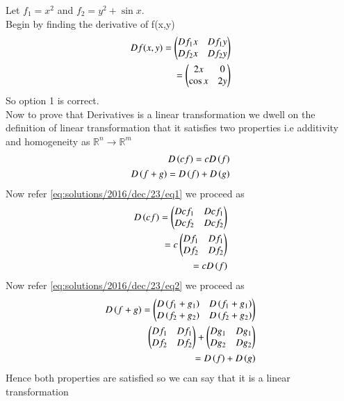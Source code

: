 Let $f_1= x^2$ and $f_2= y^2+\sin x$.\\
Begin by finding the derivative of f(x,y)
\begin{align}
D f(x,y)=\begin{pmatrix}Df_1x& Df_1y\\Df_2x&Df_2y\end{pmatrix}\\
=\begin{pmatrix}2x&0\\\cos x&2y\end{pmatrix}
\end{align}
So option 1 is correct.\\
Now to prove that   Derivatives is a linear transformation we dwell on the definition of linear transformation that it satisfies two properties i.e additivity and homogeneity as $\mathbb{R}^n\xrightarrow{}\mathbb{R}^m$
\begin{align}
 D\left(cf\right)=cD\left(f\right)\label{eq:solutions/2016/dec/23/eq1}\\
 D\left(f+g\right)=D\left(f\right)+D\left(g\right)\label{eq:solutions/2016/dec/23/eq2}
\end{align}
Now refer \eqref{eq:solutions/2016/dec/23/eq1} we proceed as
\begin{align}
 D\left(cf\right)=\begin{pmatrix}Dcf_1& Dcf_1\\Dcf_2&Dcf_2\end{pmatrix}\\
 =c\begin{pmatrix}Df_1& Df_1\\Df_2&Df_2\end{pmatrix}\\
 =cD\left(f\right)\label{eq:solutions/2016/dec/23/eq3}
\end{align}
Now refer \eqref{eq:solutions/2016/dec/23/eq2} we proceed as
\begin{align}
  D\left(f+g\right)=\begin{pmatrix}D\left(f_1+g_1\right)&D\left(f_1+g_1\right)\\D\left(f_2+g_2\right)&D\left(f_2+g_2\right)\end{pmatrix}\\
  \begin{pmatrix}Df_1& Df_1\\Df_2&Df_2\end{pmatrix}+\begin{pmatrix}Dg_1& Dg_1\\Dg_2&Dg_2\end{pmatrix}\\
  =D\left(f\right)+D\left(g\right)
\end{align}
Hence both properties are satisfied so we can say that it is a linear transformation






